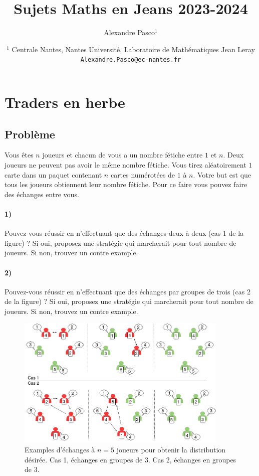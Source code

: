 \documentclass[a4paper,10pt,oneside]{article}
\title{Sujets Maths en Jeans 2023-2024}
\author{
  Alexandre Pasco${}^{1}$}
\date{\medskip%
  \small %
  ${}^1$  Centrale Nantes, Nantes Université, Laboratoire de Mathématiques Jean Leray\\
  \texttt{Alexandre.Pasco@ec-nantes.fr}
  }
\begin{document}
\maketitle


\section{Traders en herbe}

\subsection{Problème}

Vous êtes $n$ joueurs et chacun de vous a un nombre fétiche entre $1$ et $n$. 
Deux joueurs ne peuvent pas avoir le même nombre fétiche.
Vous tirez aléatoirement $1$ carte dans un paquet contenant $n$ cartes numérotées de $1$ à $n$. Votre but est que tous les joueurs obtiennent leur nombre fétiche.
Pour ce faire vous pouvez faire des échanges entre vous.

\paragraph*{1)} 
Pouvez vous réussir en n'effectuant que des échanges deux à deux (cas 1 de la figure) ? 
Si oui, proposez une stratégie qui marcherait pour tout nombre de joueurs.
Si non, trouvez un contre example.

\paragraph*{2)} 
Pouvez-vous réussir en n'effectuant que des échanges par groupes de trois (cas 2 de la figure) ?
Si oui, proposez une stratégie qui marcherait pour tout nombre de joueurs.
Si non, trouvez un contre example.

\begin{figure}[!h]
  \centering
  \includegraphics[width=0.9\textwidth]{figures/traders.png}
  \caption{Examples d'échanges à $n=5$ joueurs pour obtenir la distribution désirée. Cas 1, échanges en groupes de 3. Cas 2, échanges en groupes de 3.}
\end{figure}
\end{document}
